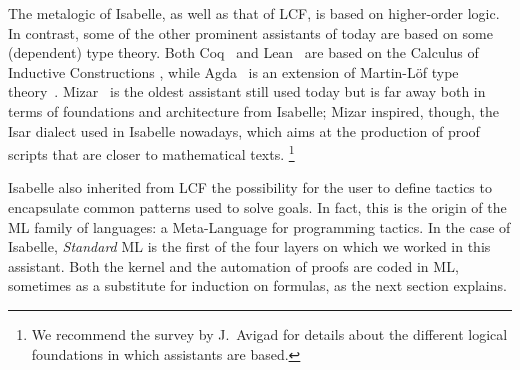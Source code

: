The metalogic of Isabelle, as well as that of LCF, is based on higher-order logic.
In contrast, some of the other prominent assistants of today are
based on some (dependent) type theory. Both Coq~\cite{coq} and
Lean~\cite{DBLP:conf/cade/Moura021} are based on the Calculus of
Inductive Constructions
\cite{DBLP:conf/mfps/PfenningP89,DBLP:journals/iandc/CoquandH88},
while Agda~\cite{agda} is an extension of Martin-Löf type
theory~\cite{DBLP:books/daglib/0000395}. Mizar~\cite{mizar} is the
oldest assistant still used today but is far away both in terms of
foundations and architecture from Isabelle; Mizar inspired, though, the
Isar \cite{DBLP:conf/tphol/Wenzel99} dialect used in Isabelle
nowadays, which aims at the production of proof scripts that are
closer to mathematical texts.%
\footnote{%
We recommend the survey \cite{2020arXiv200909541A} by
J.~Avigad for details about the different logical foundations in which
assistants are based.}

%

Isabelle also inherited from LCF the possibility for the user to define
tactics to encapsulate common patterns used to solve goals. In
fact, this is the origin of the ML family of languages: a
Meta-Language for programming tactics.
In the case of Isabelle, \emph{Standard} ML is the first of the four layers
on which we worked in this assistant. Both the kernel and the automation
of proofs are coded in ML, sometimes as a substitute for induction on
formulas, as the next section explains.

